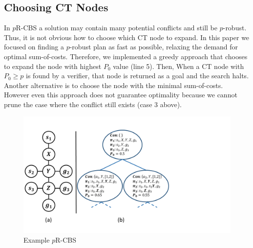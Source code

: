 \documentclass{article}
\newcommand{\prcbs}{$p$R-CBS\xspace}
\begin{document}
\subsection{Choosing CT Nodes}

In \prcbs{} a solution may contain many potential conflicts and still be $p$-robust. Thus, it is not obvious how to choose which CT node to expand. In this paper we focused on finding a $p$-robust plan as fast as possible, relaxing the demand for optimal sum-of-costs. Therefore, we implemented a greedy approach that chooses to expand the node with highest $P_0$ value (line 5). Then,  When a CT node with $P_0\geq p$ is found by a verifier, that node is returned as a goal and the search halts. Another alternative is to choose the node with the minimal sum-of-costs. However even this approach does not guarantee optimality because we cannot prune the case where the conflict still exists (case 3 above).




\begin{figure}[t]
	\centering
	\includegraphics[width=0.85\columnwidth]{Pics/cropped_probust_example.pdf}
	\caption{Example \prcbs{}}
	\vspace{-0.3cm}
	\label{fig:conflicts_example}%
\end{figure}
\end{document}
